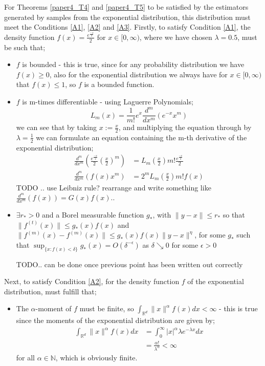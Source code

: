 \documentclass{article}
\begin{document}
For Theorems \ref{paper4_T4} and \ref{paper4_T5} to be satisfied by the estimators generated by samples from the exponential distribution, this distribution must meet the Conditions \ref{A1}, \ref{A2} and \ref{A3}. 
Firstly, to satisfy Condition \ref{A1}, the density function $f(x) =  \frac{e^{\frac{-x}{2}}}{2}$ for $x \in [0, \infty)$, where we have chosen $\lambda = 0.5$, must be such that;
\begin{itemize}
\item $f$ is bounded - this is true, since for any probability distribution we have $f(x) \geq 0$, also for the exponential distribution we always have for $x \in [0, \infty)$ that $f(x) \leq 1$, so $f$ is a bounded function.

\item $f$ is m-times differentiable - using Laguerre Polynomials;
\begin{equation}
L_{m}(x) = \frac{1}{m!} e^x \frac{d^m}{dx^m}(e^{-x} x^m) \nonumber
\end{equation}
we can see that by taking $x := \frac{x}{2}$, and multiplying the equation through by $\lambda = \frac{1}{2}$ we can formulate an equation containing the m-th derivative of the exponential distribution;
\begin{align*}
\frac{d^m}{dx^m}\left(\frac{e^{\frac{-x}{2}}}{2} \left(\frac{x}{2}\right)^m\right) &= L_{m}\left(\frac{x}{2}\right) m! \frac{e^{\frac{-x}{2}}}{2} \\
\frac{d^m}{dx^m}(f(x) x^m) &=  2^m L_{m}\left(\frac{x}{2}\right) m! f(x)
\end{align*}
TODO .. use Leibniz rule? rearrange and write something like $\frac{d^m}{dx^m}(f(x)) = G(x) f(x)$..

\item $\exists r_{*} > 0$ and a Borel measurable function $g_{*}$, with $\|y-x\| \leq r_{*}$ so that $\|f^{(t)}(x)\| \leq g_{*}(x) f(x)$ and $\|f^{(m)}(x) - f^{(m)}(x)\| \leq g_{*}(x) f(x)\|y - x\|^{\eta}$, for some $g_{*}$ such that $\sup_{\{x : f(x) < \delta\}} g_{*}(x) = O(\delta^{-\epsilon})$ as $\delta \searrow 0$ for some $\epsilon >0$

TODO.. can be done once previous point has been written out correctly
\end{itemize}

Next, to satisfy Condition \ref{A2}, for the density function $f$ of the exponential distribution, must fulfill that;
\begin{itemize}
\item The $\alpha$-moment of $f$ must be finite, so $\int_{\mathbb{R}^{d}} \| x \|^{\alpha} f(x) dx < \infty$ - this is true since the moments of the exponential distribution are given by;
\begin{align*}
\int_{\mathbb{R}^{d}} \| x \|^{\alpha} f(x) dx &= \int_{0}^{\infty} | x |^{\alpha} \lambda e^{-\lambda x} dx\\
&= \frac{\alpha !}{\lambda ^{\alpha}} < \infty
\end{align*}
for all $\alpha \in \mathbb{N}$, which is obviously finite.
\end{itemize}
\end{document}
